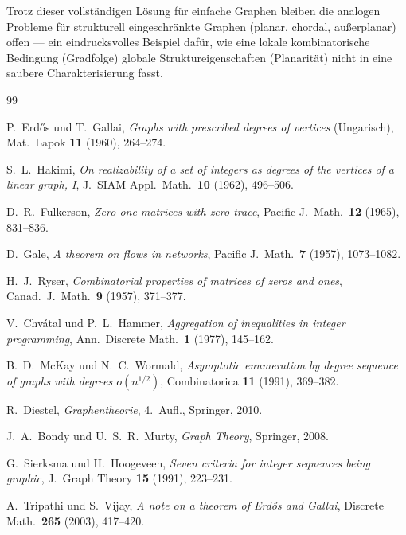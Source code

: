 \documentclass[12pt,a4paper]{amsart}
\theoremstyle{definition}
\theoremstyle{remark}
\begin{document}
Trotz dieser vollständigen Lösung für einfache Graphen bleiben die analogen Probleme
für strukturell eingeschränkte Graphen (planar, chordal, außerplanar) offen ---
ein eindrucksvolles Beispiel dafür, wie eine lokale kombinatorische Bedingung
(Gradfolge) globale Struktureigenschaften (Planarität) nicht in eine saubere
Charakterisierung fasst.

\begin{thebibliography}{99}

P.\ Erd\H{o}s und T.\ Gallai,
\textit{Graphs with prescribed degrees of vertices} (Ungarisch),
Mat.\ Lapok \textbf{11} (1960), 264--274.

S.\ L.\ Hakimi,
\textit{On realizability of a set of integers as degrees of the vertices of a
linear graph, I},
J.\ SIAM Appl.\ Math.\ \textbf{10} (1962), 496--506.

D.\ R.\ Fulkerson,
\textit{Zero-one matrices with zero trace},
Pacific J.\ Math.\ \textbf{12} (1965), 831--836.

D.\ Gale,
\textit{A theorem on flows in networks},
Pacific J.\ Math.\ \textbf{7} (1957), 1073--1082.

H.\ J.\ Ryser,
\textit{Combinatorial properties of matrices of zeros and ones},
Canad.\ J.\ Math.\ \textbf{9} (1957), 371--377.

V.\ Chvátal und P.\ L.\ Hammer,
\textit{Aggregation of inequalities in integer programming},
Ann.\ Discrete Math.\ \textbf{1} (1977), 145--162.

B.\ D.\ McKay und N.\ C.\ Wormald,
\textit{Asymptotic enumeration by degree sequence of graphs with degrees
$o(n^{1/2})$},
Combinatorica \textbf{11} (1991), 369--382.

R.\ Diestel,
\textit{Graphentheorie},
4.\ Aufl., Springer, 2010.

J.\ A.\ Bondy und U.\ S.\ R.\ Murty,
\textit{Graph Theory},
Springer, 2008.

G.\ Sierksma und H.\ Hoogeveen,
\textit{Seven criteria for integer sequences being graphic},
J.\ Graph Theory \textbf{15} (1991), 223--231.

A.\ Tripathi und S.\ Vijay,
\textit{A note on a theorem of Erd\H{o}s and Gallai},
Discrete Math.\ \textbf{265} (2003), 417--420.

\end{thebibliography}
\end{document}
